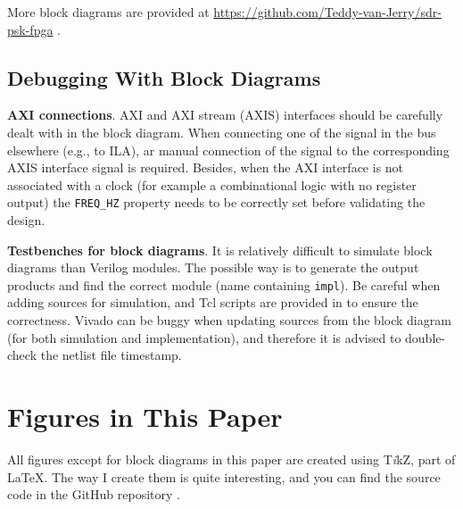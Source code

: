 \documentclass[journal,twoside]{IEEEtran}
\begin{document}
    More block diagrams are provided at \url{https://github.com/Teddy-van-Jerry/sdr-psk-fpga} \cite{github_repo}.

    \subsection{Debugging With Block Diagrams}

      \textbf{AXI connections}.
      AXI and AXI stream (AXIS) interfaces should be carefully dealt with in the block diagram.
      When connecting one of the signal in the bus elsewhere (e.g., to ILA),
      ar manual connection of the signal to the corresponding AXIS interface signal is required.
      Besides, when the AXI interface is not associated with a clock (for example a combinational logic with no register output)
      the \texttt{FREQ\_HZ} property needs to be correctly set before validating the design.

      \textbf{Testbenches for block diagrams}.
      It is relatively difficult to simulate block diagrams than Verilog modules.
      The possible way is to generate the output products and find the correct module (name containing \texttt{impl}).
      Be careful when adding sources for simulation, and Tcl scripts are provided in \cite{github_repo} to ensure the correctness.
      Vivado can be buggy when updating sources from the block diagram (for both simulation and implementation),
      and therefore it is advised to double-check the netlist file timestamp.


  \section{Figures in This Paper}

    All figures except for block diagrams in this paper
    are created using T\textit{i}kZ, part of \LaTeX{}.
    The way I create them is quite interesting,
    and you can find the source code in the GitHub repository \cite{github_repo}.

  
  
\end{document}
